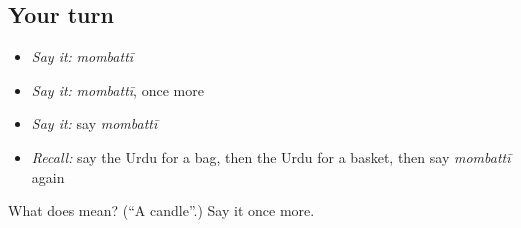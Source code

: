 \subsection*{Your turn}
\begin{itemize}
\raggedright
  \item \emph{Say it:} \emph{mombattī}
  \item \emph{Say it:} \emph{mombattī}, once more
  \item \emph{Say it:} say \emph{mombattī}
  \item \emph{Recall:} say the Urdu for a bag, then the Urdu for a basket, then say \emph{mombattī} again
\end{itemize}

\begin{tcolorbox}[breakable,colback=teal!4,colframe=teal!35!black,title={Before you move on}]
What does   mean? (\textquotedblleft{}A candle\textquotedblright{}.) Say it once more.
\end{tcolorbox}
